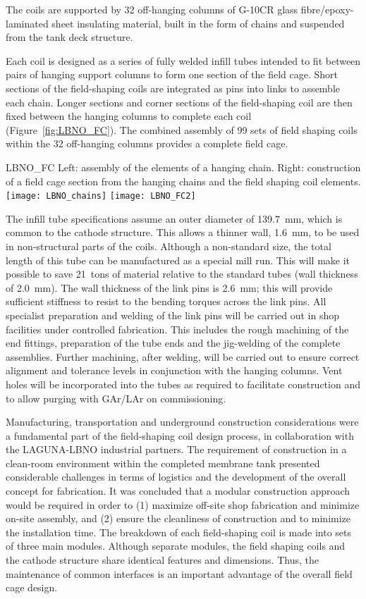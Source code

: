 The coils are supported by 32 off-hanging columns of G-10CR glass
fibre/epoxy-laminated sheet insulating material, built in the form of
chains and suspended from the tank deck structure.

Each coil is designed as a series of fully welded infill tubes
intended to fit between pairs of hanging support columns to form one
section of the field cage.  Short sections of the field-shaping coils
are integrated as pins into links to assemble each chain.  Longer
sections and corner sections of the field-shaping coil are then fixed
between the hanging columns to complete each coil
(Figure~\ref{fig:LBNO_FC}). The combined assembly of 99 sets of field
shaping coils within the 32 off-hanging columns provides a complete
field cage.
\begin{cdrfigure}{LBNO_FC}
{\small Left: assembly of the elements of a hanging chain. Right: 
construction of a field cage section from the hanging chains and the field shaping coil elements.}
\texttt{[image: LBNO\_chains]} \hfill
\texttt{[image: LBNO\_FC2]}
\end{cdrfigure}

The infill tube specifications assume an outer diameter of 139.7~mm,
which is common to the cathode structure.  This allows a thinner wall,
1.6~mm, to be used in non-structural parts of the coils.  Although a
non-standard size, the total length of this tube can be manufactured
as a special mill run.  This will make it possible to save 21~tons of
material relative to the standard tubes (wall thickness of
2.0~mm). The wall thickness of the link pins is 2.6~mm; this will
provide sufficient stiffness to resist to the bending torques across
the link pins.  All specialist preparation and welding of the link
pins will be carried out in shop facilities under controlled
fabrication.  This includes the rough machining of the end fittings,
preparation of the tube ends and the jig-welding of the complete
assemblies. Further machining, after welding, will be carried out to
ensure correct alignment and tolerance levels in conjunction with the
hanging columns.  Vent holes will be incorporated into the tubes as
required to facilitate construction and to allow purging with GAr/LAr
on commissioning.

Manufacturing, transportation and underground construction
considerations were a fundamental part of the field-shaping coil
design process, in collaboration with the LAGUNA-LBNO industrial
partners. The requirement of construction in a clean-room environment
within the completed membrane tank presented considerable challenges
in terms of logistics and the development of the overall concept for
fabrication.  It was concluded that a modular construction approach
would be required in order to (1) maximize off-site shop fabrication
and minimize on-site assembly, and (2) ensure the cleanliness of
construction and to minimize the installation time. The breakdown of
each field-shaping coil is made into sets of three main modules.
Although separate modules, the field shaping coils and the cathode
structure share identical features and dimensions.  Thus, the
maintenance of common interfaces is an important advantage of the
overall field cage design.
 
